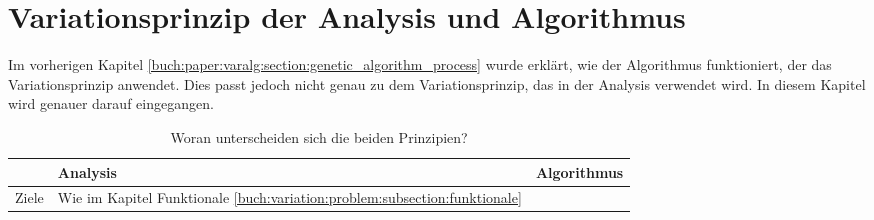 %
%
%
%
\section{Variationsprinzip der Analysis und Algorithmus
\label{buch:paper:varalg:section:variations_analysis_algorithm_result}}
Im vorherigen Kapitel \ref{buch:paper:varalg:section:genetic_algorithm_process} wurde erklärt, 
wie der Algorithmus funktioniert, der das Variationsprinzip anwendet. Dies 
passt jedoch nicht genau zu dem Variationsprinzip, das in der Analysis 
verwendet wird. In diesem Kapitel wird genauer darauf eingegangen.
\begin{table}
   \centering
   \caption{Woran unterscheiden sich die beiden Prinzipien?}
   \begin{tabularx}{\textwidth}{|X|X|X|}
      \hline
       & Analysis 
       & Algorithmus 
       \\ \hline
      Ziele  
       & Wie im Kapitel Funktionale \ref{buch:variation:problem:subsection:funktionale}


\end{tabularx}
\end{table}
